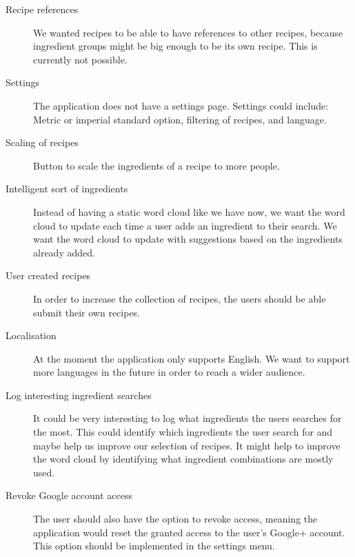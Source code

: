 \begin{description}
\item[Recipe references] We wanted recipes to be able to have references to other recipes, because ingredient groups might be big enough to be its own recipe. This is currently not possible.

\item[Settings] The application does not have a settings page. Settings could include: Metric or imperial standard option, filtering of recipes, and language.

\item[Scaling of recipes] Button to scale the ingredients of a recipe to more people.

\item [Intelligent sort of ingredients] Instead of having a static word cloud like we have now, we want the word cloud to update each time a user adds an ingredient to their search. We want the word cloud to update with suggestions based on the ingredients already added.

\item [User created recipes] In order to increase the collection of recipes, the users should be able submit their own recipes.

\item [Localisation] At the moment the application only supports English. We want to support more languages in the future in order to reach a wider audience.
\item [Log interesting ingredient searches] It could be very interesting to log what ingredients the users searches for the most. This could identify which ingredients the user search for and maybe help us improve our selection of recipes. It might help to improve the word cloud by identifying what ingredient combinations are mostly used.
\item [Revoke Google account access]
The user should also have the option to revoke access, meaning the application would reset the granted access to the user's Google+ account.
This option should be implemented in the settings menu.
\end{description}
